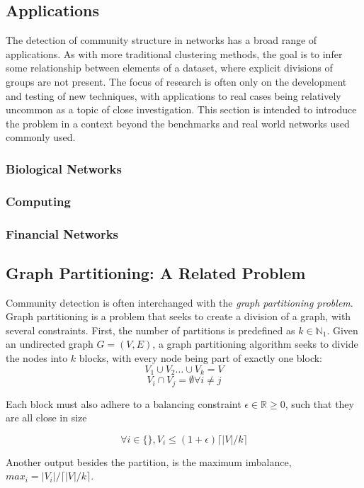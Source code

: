 \subsection{Applications}
The detection of community structure in networks has a broad range of applications. As with more traditional clustering methods, the goal is to infer some relationship between elements of a dataset, where explicit divisions of groups are not present. The focus of research is often only on the development and testing of new techniques, with applications to real cases being relatively uncommon as a topic of close investigation. This section is intended to introduce the problem in a context beyond the benchmarks and real world networks used commonly used.

\subsubsection{Biological Networks}

\subsubsection{Computing}

\subsubsection{Financial Networks}

\subsection{Graph Partitioning: A Related Problem}

Community detection is often interchanged with the \textit{graph partitioning problem}. Graph partitioning is a problem that seeks to create a division of a graph, with several constraints. First, the number of partitions is predefined as $k \in \mathbb{N}_1$. Given an undirected graph $G=(V,E)$, a graph partitioning algorithm seeks to divide the nodes into $k$ blocks, with every node being part of exactly one block:
$$V_1 \cup V_2 \dots \cup V_k = V$$
$$V_i \cap V_j = \emptyset \forall i\neq j$$

Each block must also adhere to a balancing constraint $\epsilon \in \mathbb{R}\geq0$, such that they are all close in size

$$\forall i \in \{\}, V_i \leq (1+\epsilon)\lceil|V|/k\rceil$$

Another output besides the partition, is the maximum imbalance, $max_i=|V_i|/\lceil|V|/k\rceil$.





